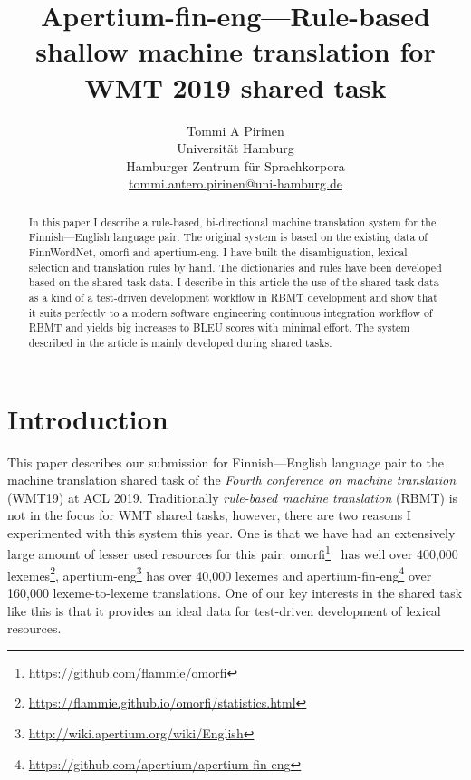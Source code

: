 \documentclass[free]{flammie}
\title{Apertium-fin-eng---Rule-based shallow machine translation for WMT 2019
shared task}
\author{Tommi A Pirinen\\
    Universit\"at Hamburg\\
    Hamburger Zentrum f\"ur Sprachkorpora\\
    \url{tommi.antero.pirinen@uni-hamburg.de}
}
\begin{document}
\maketitle
\begin{abstract}
    In this paper I describe a rule-based, bi-directional machine translation
    system for the Finnish---English language pair. The original system is
    based on the existing data of FinnWordNet, omorfi and apertium-eng.
    I have built the disambiguation, lexical selection and translation rules
    by hand. The dictionaries and rules have been developed based
    on the shared task data. I describe in this article the use of the
    shared task data as a kind of a test-driven development workflow in RBMT
    development and show that it suits perfectly to a modern software
    engineering continuous integration workflow of RBMT and yields big increases
    to BLEU scores with minimal effort. The system described in the article
    is mainly developed during shared tasks.\@
\end{abstract}


\section{Introduction}\label{sec:introduction}


This paper describes our submission for Finnish---English language pair to the
machine translation shared task of the \textit{Fourth conference on machine
translation} (WMT19) at ACL 2019. Traditionally \textit{rule-based machine
translation} (RBMT) is not in the focus for WMT shared tasks, however,
there are two reasons I experimented with this system this year. One is that we
have had an extensively large amount of lesser used resources for this pair:
omorfi\footnote{\url{https://github.com/flammie/omorfi}}~\cite{omorfi} has well
over 400,000
lexemes\footnote{\url{https://flammie.github.io/omorfi/statistics.html}},
apertium-eng\footnote{\url{http://wiki.apertium.org/wiki/English}} has over
40,000 lexemes and
apertium-fin-eng\footnote{\url{https://github.com/apertium/apertium-fin-eng}}
over 160,000 lexeme-to-lexeme translations. One of our key interests in the
shared task like this is that it provides an ideal data for test-driven
development of lexical resources.
\end{document}

